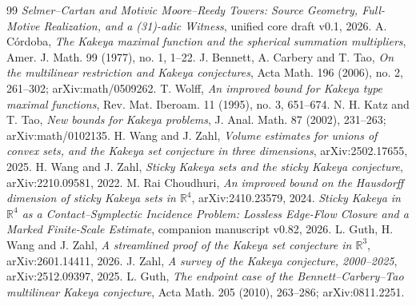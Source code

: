 \documentclass[11pt]{article}
\begin{document}
\begin{thebibliography}{99}
\emph{Selmer--Cartan and Motivic Moore--Reedy Towers: Source Geometry,
Full-Motive Realization, and a (31)-adic Witness}, unified core draft v0.1,
2026.
A. C\'ordoba,
\emph{The Kakeya maximal function and the spherical summation multipliers},
Amer. J. Math. 99 (1977), no. 1, 1--22.
J. Bennett, A. Carbery and T. Tao,
\emph{On the multilinear restriction and Kakeya conjectures},
Acta Math. 196 (2006), no. 2, 261--302; arXiv:math/0509262.
T. Wolff,
\emph{An improved bound for Kakeya type maximal functions},
Rev. Mat. Iberoam. 11 (1995), no. 3, 651--674.
N. H. Katz and T. Tao,
\emph{New bounds for Kakeya problems},
J. Anal. Math. 87 (2002), 231--263; arXiv:math/0102135.
H. Wang and J. Zahl,
\emph{Volume estimates for unions of convex sets, and the Kakeya set
conjecture in three dimensions}, arXiv:2502.17655, 2025.
H. Wang and J. Zahl,
\emph{Sticky Kakeya sets and the sticky Kakeya conjecture},
arXiv:2210.09581, 2022.
M. Rai Choudhuri,
\emph{An improved bound on the Hausdorff dimension of sticky Kakeya sets
in \(\mathbb R^4\)}, arXiv:2410.23579, 2024.
\emph{Sticky Kakeya in \(\mathbb R^4\) as a Contact--Symplectic Incidence
Problem: Lossless Edge-Flow Closure and a Marked Finite-Scale Estimate},
companion manuscript v0.82, 2026.
L. Guth, H. Wang and J. Zahl,
\emph{A streamlined proof of the Kakeya set conjecture in
\(\mathbb R^3\)}, arXiv:2601.14411, 2026.
J. Zahl,
\emph{A survey of the Kakeya conjecture, 2000--2025}, arXiv:2512.09397,
2025.
L. Guth,
\emph{The endpoint case of the Bennett--Carbery--Tao multilinear Kakeya
conjecture}, Acta Math. 205 (2010), 263--286; arXiv:0811.2251.
\end{thebibliography}
\end{document}
